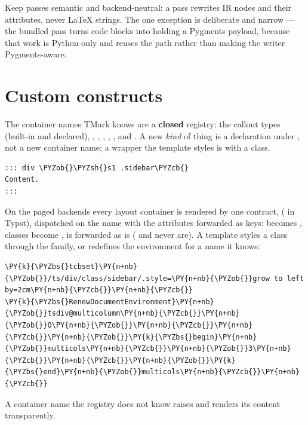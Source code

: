 \documentclass[a4paper,twoside]{article}
\begin{document}
Keep passes semantic and backend-neutral: a pass rewrites IR nodes and their
attributes, never \LaTeX{} strings. The one exception is deliberate and narrow ---
the bundled  pass turns code blocks into 
holding a Pygments payload, because that work is Python-only and reuses the
 path rather than making the writer Pygments-aware.
\section{Custom constructs}
The container names TMark knows are a \textbf{closed} registry: the callout types
(built-in and declared), , , , , ,
 and . A new \emph{kind} of thing is a declaration under
, not a new container name; a wrapper the template
styles is  with a class.
\begin{tscode}[lang=md, engine=pygments]
\begin{Verbatim}[commandchars=\\\{\},breaklines, breakanywhere, commandchars=\\\{\}]
::: div \PYZob{}\PYZsh{}s1 .sidebar\PYZcb{}
Content.
:::
\end{Verbatim}
\end{tscode}
On the paged backends every layout container is rendered by one contract,
 ( in Typst), dispatched on the
name with the attributes forwarded as keys:  becomes , classes become
,  is forwarded as is ( and  never are). A
template styles a class through the  family, or redefines the
environment for a name it knows:
\begin{tscode}[lang=latex, engine=pygments]
\begin{Verbatim}[commandchars=\\\{\},breaklines, breakanywhere, commandchars=\\\{\}]
\PY{k}{\PYZbs{}tcbset}\PY{n+nb}{\PYZob{}}/ts/div/class/sidebar/.style=\PY{n+nb}{\PYZob{}}grow to left by=2cm\PY{n+nb}{\PYZcb{}}\PY{n+nb}{\PYZcb{}}
\PY{k}{\PYZbs{}RenewDocumentEnvironment}\PY{n+nb}{\PYZob{}}tsdiv@multicolumn\PY{n+nb}{\PYZcb{}}\PY{n+nb}{\PYZob{}}O\PY{n+nb}{\PYZob{}}\PY{n+nb}{\PYZcb{}}\PY{n+nb}{\PYZcb{}}\PY{n+nb}{\PYZob{}}\PY{k}{\PYZbs{}begin}\PY{n+nb}{\PYZob{}}multicols\PY{n+nb}{\PYZcb{}}\PY{n+nb}{\PYZob{}}3\PY{n+nb}{\PYZcb{}}\PY{n+nb}{\PYZcb{}}\PY{n+nb}{\PYZob{}}\PY{k}{\PYZbs{}end}\PY{n+nb}{\PYZob{}}multicols\PY{n+nb}{\PYZcb{}}\PY{n+nb}{\PYZcb{}}
\end{Verbatim}
\end{tscode}
A container name the registry does not know raises  and
renders its content transparently.
\end{document}

